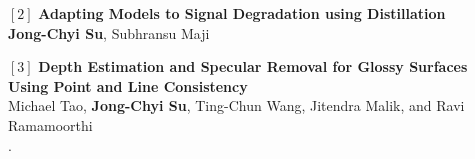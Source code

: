 \documentclass[10pt,letterpaper]{article}
\begin{document}
\vspace{8pt}
\noindent $[2]$ {\bf Adapting Models to Signal Degradation using Distillation}\\
\indent \textbf{Jong-Chyi Su}, Subhransu Maji \\

\vspace{8pt}
\noindent $[3]$ {\bf Depth Estimation and Specular Removal for Glossy Surfaces Using Point and Line Consistency}
\\
\indent Michael Tao, \textbf{Jong-Chyi Su}, Ting-Chun Wang, Jitendra Malik, and Ravi Ramamoorthi \\
.

\vspace{-3pt}


%
%
\end{document}
